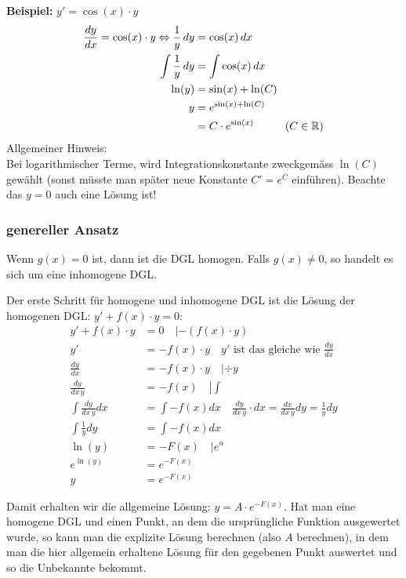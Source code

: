 \textbf{Beispiel:} $y' = \cos(x) \cdot y$
\begin{align*}
	\frac{dy}{dx} = \cos(x) \cdot y \Leftrightarrow \frac{1}{y} \, dy &= \cos(x) \, dx\\
	\int \frac{1}{y} \, dy &= \int \cos(x) \, dx \\
	\ln(y) &= \sin(x) + \ln(C)\\
	y &= e^{\sin(x) + \ln(C)} \\
	 &= C \cdot e^{\sin(x)}	\hspace{1cm} (C \in \mathbb{R})
\end{align*}
{\small Allgemeiner Hinweis:\\
Bei logarithmischer Terme, wird Integrationskonstante zweckgemäss $\ln(C)$ gewählt (sonst müsste man später neue Konstante $C' = e^C$ einführen). Beachte das $y = 0$ auch eine Lösung ist!}



\subsubsection{genereller Ansatz}
Wenn $g(x) = 0$ ist, dann ist die DGL homogen. Falls $g(x) \neq 0$, so handelt
es sich um eine inhomogene DGL.

Der erste Schritt für homogene und inhomogene DGL ist die Lösung der homogenen
DGL: $y' + f(x) \cdot y = 0$:
{\small
\begin{align*}
y' + f(x) \cdot y &= 0 \quad \left | -(f(x) \cdot y) \right.\\
y' &= -f(x) \cdot y \quad \boxed{y' \text{ ist das gleiche wie } \frac{dy}{dx}}\\
\frac{dy}{dx} &= -f(x) \cdot y \quad \left | \div y \right.\\
\frac{dy}{dx\, y} &= -f(x) \quad \left | \int \right.\\
\int \frac{dy}{dx\, y} dx &= \int -f(x) dx \quad \boxed{\frac{dy}{dx\, y} \cdot dx = \frac{dx}{dx\, y} dy = \frac{1}{y} dy}\\
\int \frac{1}{y} dy &= \int -f(x) dx\\
\ln(y) &= -F(x) \quad \left | e^\alpha \right.\\
e^{\ln(y)} &= e^{-F(x)}\\
y &= e^{-F(x)}
\end{align*}
}

Damit erhalten wir die allgemeine Lösung: $y = A \cdot e^{-F(x)}$. Hat man eine
homogene DGL und einen Punkt, an dem die ursprüngliche Funktion ausgewertet wurde,
so kann man die explizite Lösung berechnen (also $A$ berechnen), in dem man die
hier allgemein erhaltene Lösung für den gegebenen Punkt auswertet und so die
Unbekannte bekommt.

